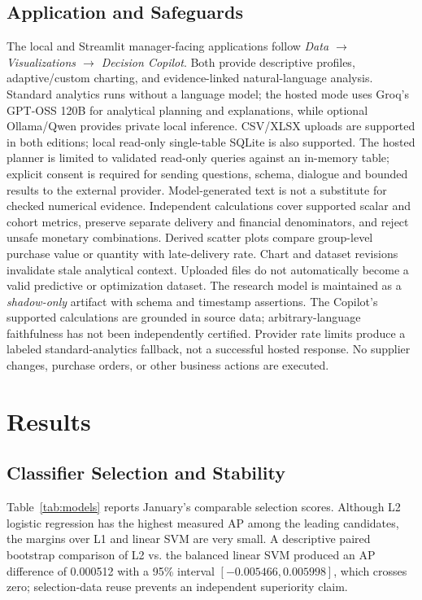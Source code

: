 \documentclass[conference,a4paper]{IEEEtran}
\begin{document}
\subsection{Application and Safeguards}
The local and Streamlit manager-facing applications follow \emph{Data $\rightarrow$ Visualizations $\rightarrow$ Decision Copilot}. Both provide descriptive profiles, adaptive/custom charting, and evidence-linked natural-language analysis. Standard analytics runs without a language model; the hosted mode uses Groq's GPT-OSS 120B for analytical planning and explanations, while optional Ollama/Qwen provides private local inference. CSV/XLSX uploads are supported in both editions; local read-only single-table SQLite is also supported. The hosted planner is limited to validated read-only queries against an in-memory table; explicit consent is required for sending questions, schema, dialogue and bounded results to the external provider. Model-generated text is not a substitute for checked numerical evidence. Independent calculations cover supported scalar and cohort metrics, preserve separate delivery and financial denominators, and reject unsafe monetary combinations. Derived scatter plots compare group-level purchase value or quantity with late-delivery rate. Chart and dataset revisions invalidate stale analytical context. Uploaded files do not automatically become a valid predictive or optimization dataset. The research model is maintained as a \emph{shadow-only} artifact with schema and timestamp assertions. The Copilot's supported calculations are grounded in source data; arbitrary-language faithfulness has not been independently certified. Provider rate limits produce a labeled standard-analytics fallback, not a successful hosted response. No supplier changes, purchase orders, or other business actions are executed.

\section{Results}
\subsection{Classifier Selection and Stability}
Table~\ref{tab:models} reports January's comparable selection scores. Although L2 logistic regression has the highest measured AP among the leading candidates, the margins over L1 and linear SVM are very small. A descriptive paired bootstrap comparison of L2 vs. the balanced linear SVM produced an AP difference of 0.000512 with a 95\% interval $[-0.005466,0.005998]$, which crosses zero; selection-data reuse prevents an independent superiority claim.
\end{document}
